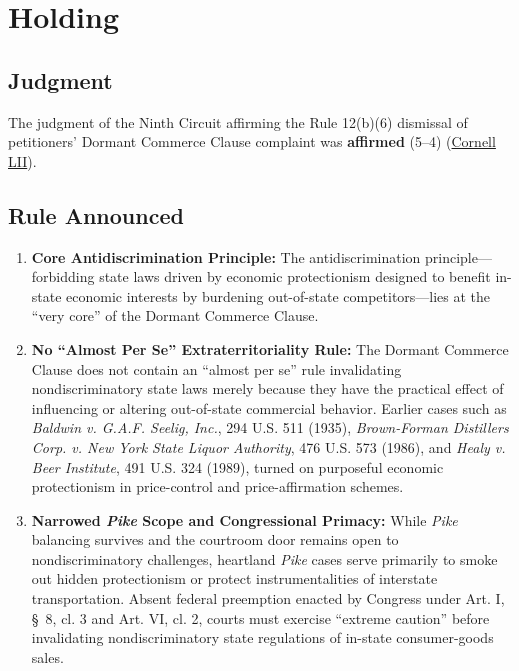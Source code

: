\documentclass[12pt]{article}
\begin{document}
\section{Holding}
\subsection{Judgment}
The judgment of the Ninth Circuit affirming the Rule 12(b)(6) dismissal of petitioners' Dormant Commerce Clause complaint was \textbf{affirmed} (5--4) (\href{https://www.law.cornell.edu/supremecourt/text/21-468}{Cornell LII}).

\subsection{Rule Announced}
\begin{enumerate}
\item \textbf{Core Antidiscrimination Principle:} The antidiscrimination principle---forbidding state laws driven by economic protectionism designed to benefit in-state economic interests by burdening out-of-state competitors---lies at the ``very core'' of the Dormant Commerce Clause.
\item \textbf{No ``Almost Per Se'' Extraterritoriality Rule:} The Dormant Commerce Clause does not contain an ``almost per se'' rule invalidating nondiscriminatory state laws merely because they have the practical effect of influencing or altering out-of-state commercial behavior. Earlier cases such as \textit{Baldwin v. G.A.F. Seelig, Inc.}, 294 U.S. 511 (1935), \textit{Brown-Forman Distillers Corp. v. New York State Liquor Authority}, 476 U.S. 573 (1986), and \textit{Healy v. Beer Institute}, 491 U.S. 324 (1989), turned on purposeful economic protectionism in price-control and price-affirmation schemes.
\item \textbf{Narrowed \textit{Pike} Scope and Congressional Primacy:} While \textit{Pike} balancing survives and the courtroom door remains open to nondiscriminatory challenges, heartland \textit{Pike} cases serve primarily to smoke out hidden protectionism or protect instrumentalities of interstate transportation. Absent federal preemption enacted by Congress under Art. I, \S~8, cl. 3 and Art. VI, cl. 2, courts must exercise ``extreme caution'' before invalidating nondiscriminatory state regulations of in-state consumer-goods sales.
\end{enumerate}
\end{document}
